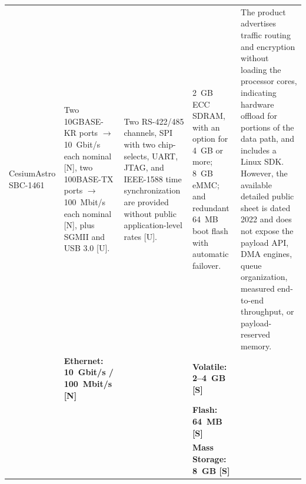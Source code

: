 \documentclass[10pt]{../datasheet}
\let\cite\citep
\begin{document}
\begin{landscape}
\begin{longtable}{|p{3.2cm}|p{4.5cm}|p{4.5cm}|p{4.5cm}|p{5.5cm}|}
    CesiumAstro SBC-1461 \cite{cesiumastro_sbc_1461_ds}                &
    Two 10GBASE-KR ports $\rightarrow$ 10~Gbit/s each nominal [N], two
    100BASE-TX ports $\rightarrow$ 100~Mbit/s each nominal [N], plus SGMII and
    USB 3.0 [U].                                                       & Two RS-422/485 channels, SPI with two
    chip-selects, UART, JTAG, and IEEE-1588 time synchronization are provided
    without public application-level rates [U].                        & 2~GB ECC SDRAM, with an
    option for 4~GB or more; 8~GB eMMC; and redundant 64~MB boot flash with
    automatic failover.                                                & The product advertises
    traffic routing and encryption without loading the processor cores,
    indicating hardware offload for portions of the data path, and includes a
    Linux SDK. However, the available detailed public sheet is dated 2022 and
    does not expose the payload API, DMA engines, queue organization, measured
    end-to-end throughput, or payload-reserved memory.
    \\
    \cline{2-5}
                                                                       & \textbf{Ethernet: 10~Gbit/s / 100~Mbit/s [N]}
                                                                       &
                                                                       & \textbf{Volatile: 2--4~GB [S]}                                             &                                                                                                \\
                                                                       &                                                                            &                                                  & \textbf{Flash: 64~MB [S]}                 & \\
                                                                       &                                                                            &                                                  & \textbf{Mass Storage: 8~GB [S]}           & \\ \hline\hline


\end{longtable}
\end{landscape}
\end{document}
